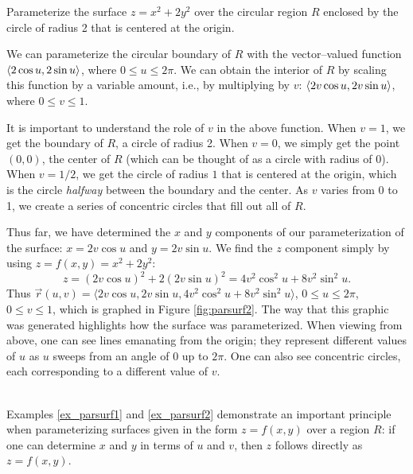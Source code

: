 {Parameterize the surface $z=x^2+2y^2$ over the circular region $R$ enclosed by the circle of radius 2 that is centered at the origin.
}
{We can parameterize the circular boundary of $R$ with the vector--valued function $\left\langle 2\cos u,2\sin u\right\rangle$, where $0\leq u\leq 2\pi$. We can obtain the interior of $R$ by scaling this function by a variable amount, i.e., by multiplying by $v$: $\left\langle 2v\cos u,2v\sin u\right\rangle$, where $0\leq v\leq 1$. 

It is important to understand the role of $v$ in the above function. When $v=1$, we get the boundary of $R$, a circle of radius 2. When $v=0$, we simply get the point $(0,0)$, the center of $R$ (which can be thought of as a circle with radius of 0). When $v=1/2$, we get the circle of radius $1$ that is centered at the origin, which is the circle \emph{halfway} between the boundary and the center. As $v$ varies from 0 to 1, we create a series of concentric circles that fill out all of $R$.


Thus far, we have determined the $x$ and $y$ components of our parameterization of the surface: $x=2v\cos u$ and $y=2v\sin u$. We find the $z$ component simply by using $z = f(x,y) = x^2+2y^2$: 
$$z = (2v\cos u)^2+2(2v\sin u)^2 = 4v^2\cos^2u+8v^2\sin^2u.$$
Thus $\vec r(u,v) = \langle 2v\cos u,2v\sin u,4v^2\cos^2u+8v^2\sin^2u\rangle$, $0\leq u\leq 2\pi$, $0\leq v\leq 1$, which is graphed in Figure \ref{fig:parsurf2}. The way that this graphic was generated highlights how the surface was parameterized. When viewing from above, one can see lines emanating from the origin; they represent different values of $u$ as $u$ sweeps from an angle of 0 up to $2\pi$. One can also see concentric circles, each corresponding to a different value of $v$. 
}\\

Examples \ref{ex_parsurf1} and \ref{ex_parsurf2} demonstrate an important principle when parameterizing surfaces given in the form $z=f(x,y)$ over a region $R$: if one can determine $x$ and $y$ in terms of $u$ and $v$, then $z$ follows directly as $z=f(x,y)$. 


